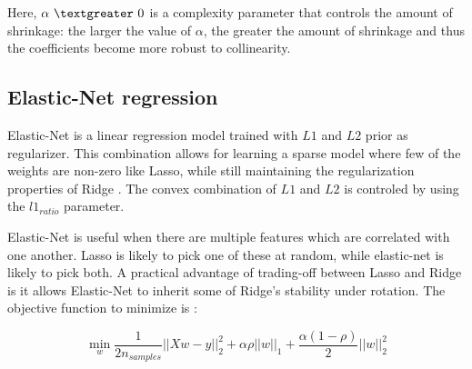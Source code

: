 Here, $\alpha \ \textgreater \  0$ is a complexity parameter that controls the amount of shrinkage: the larger the value of $\alpha$, the greater the amount of shrinkage and thus the coefficients become more robust to collinearity.

\subsection{Elastic-Net regression}
Elastic-Net is a linear regression model trained with $L1$ and $L2$ prior as regularizer. This combination allows for learning a sparse model where few of the weights are non-zero like Lasso, while still maintaining the regularization properties of Ridge  \citep{scikitlearn2011}. The convex combination of $L1$ and $L2$ is controled by using the $l1_{ratio}$ parameter.

Elastic-Net is useful when there are multiple features which are correlated with one another. Lasso is likely to pick one of these at random, while elastic-net is likely to pick both.
A practical advantage of trading-off between Lasso and Ridge is it allows Elastic-Net to inherit some of Ridge’s stability under rotation. The objective function to minimize is \citep{scikitlearn2011}:

$$\min_{w} { \frac{1}{2n_{samples}} \Bigr| \Bigr| Xw - y \Bigr| \Bigr|_2^2  + \alpha \rho \Bigr| \Bigr| w \Bigr| \Bigr|_1 + \frac{\alpha (1- \rho)}{2} \Bigr| \Bigr| w \Bigr| \Bigr|_2^2 } $$

